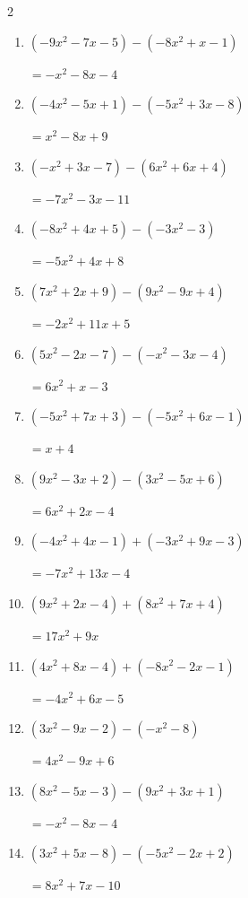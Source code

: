 \begin{multicols}{2}
\begin{enumerate}
        $=5x^{2}+4x-5$

  \item $(-9x^{2}-7x-5)-(-8x^{2}+x-1)$

        $=-x^{2}-8x-4$

  \item $(-4x^{2}-5x+1)-(-5x^{2}+3x-8)$

        $=x^{2}-8x+9$

  \item $(-x^{2}+3x-7)-(6x^{2}+6x+4)$

        $=-7x^{2}-3x-11$

  \item $(-8x^{2}+4x+5)-(-3x^{2}-3)$

        $=-5x^{2}+4x+8$

  \item $(7x^{2}+2x+9)-(9x^{2}-9x+4)$

        $=-2x^{2}+11x+5$

  \item $(5x^{2}-2x-7)-(-x^{2}-3x-4)$

        $=6x^{2}+x-3$

  \item $(-5x^{2}+7x+3)-(-5x^{2}+6x-1)$

        $=x+4$

  \item $(9x^{2}-3x+2)-(3x^{2}-5x+6)$

        $=6x^{2}+2x-4$

  \item $(-4x^{2}+4x-1)+(-3x^{2}+9x-3)$

        $=-7x^{2}+13x-4$

  \item $(9x^{2}+2x-4)+(8x^{2}+7x+4)$

        $=17x^{2}+9x$

  \item $(4x^{2}+8x-4)+(-8x^{2}-2x-1)$

        $=-4x^{2}+6x-5$

  \item $(3x^{2}-9x-2)-(-x^{2}-8)$

        $=4x^{2}-9x+6$

  \item $(8x^{2}-5x-3)-(9x^{2}+3x+1)$

        $=-x^{2}-8x-4$

  \item $(3x^{2}+5x-8)-(-5x^{2}-2x+2)$

        $=8x^{2}+7x-10$


\end{enumerate}
\end{multicols}
